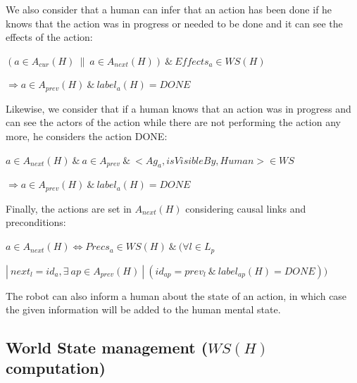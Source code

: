 \documentclass[english,a4paper,11pt,twoside]{StyleThese}
\begin{document}
We also consider that a human can infer that an action has been done if he knows that the action was in progress or needed to be done and it can see the effects of the action:

\begin{center}
$(a \in A_{cur}(H) \ \| \ a \in A_{next}(H)) \ \& \ Effects_{a} \in WS(H)$ 

$\Rightarrow a \in A_{prev}(H) \ \& \ label_a(H) = DONE$
\end{center}

Likewise, we consider that if a human knows that an action was in progress and can see the actors of the action while there are not performing the action any more, he considers the action DONE:

\begin{center}
$a \in A_{next}(H) \ \& \ a \in A_{prev} \ \& \ <Ag_a, isVisibleBy, Human> \in WS$

$\Rightarrow a \in A_{prev}(H) \ \& \ label_a(H) = DONE$
\end{center}

Finally, the actions are set in $A_{next}(H)$ considering causal links and preconditions:

\begin{center}
$a \in A_{next}(H) \Leftrightarrow Precs_{a} \in WS(H) \ \& \ (\forall l \in L_p$ 

$| \ next_l = id_a, \exists \ ap \in A_{prev}(H) \ | \ (id_{ap} = prev_l \ \& \ label_{ap}(H)  = DONE))$
\end{center}

The robot can also inform a human about the state of an action, in which case the given information will be added to the human mental state.

\subsection{World State management ($WS(H)$ computation)}
\label{subsec:worldstate}
\end{document}

